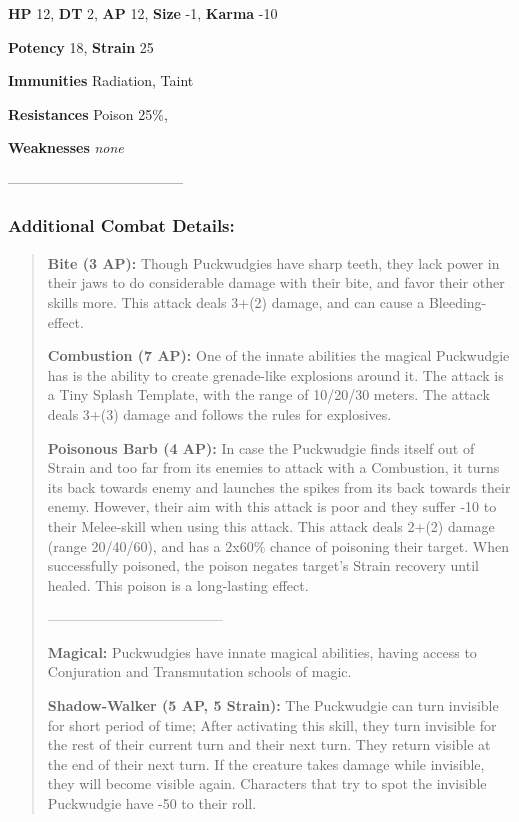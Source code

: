 \documentclass[11pt,a4paper,twocolumn]{book}
\begin{document}
	\noindent
	\textbf{HP} 12, \textbf{DT} 2, \textbf{AP} 12, \textbf{Size} -1, \textbf{Karma} -10
	
	\noindent
	\textbf{Potency} 18, \textbf{Strain} 25
	
	\noindent
	\textbf{Immunities} Radiation, Taint%
	
	\noindent
	\textbf{Resistances} Poison 25\%, %
	
	\noindent
	\textbf{Weaknesses} \emph{none}%
	
	--------------------------------------	
	
	\subsubsection*{Additional Combat Details:}
	\begin{verse}
		\textbf{Bite (3 AP):} Though Puckwudgies have sharp teeth, they lack power in their jaws to do considerable damage with their bite, and favor their other skills more. This attack deals 3+(2) damage, and can cause a Bleeding-effect.
		
		\textbf{Combustion (7 AP):} One of the innate abilities the magical Puckwudgie has is the ability to create grenade-like explosions around it. The attack is a Tiny Splash Template, with the range of 10/20/30 meters. The attack deals 3+(3) damage and follows the rules for explosives.
		
		\textbf{Poisonous Barb (4 AP):} In case the Puckwudgie finds itself out of Strain and too far from its enemies to attack with a Combustion, it turns its back towards enemy and launches the spikes from its back towards their enemy. However, their aim with this attack is poor and they suffer -10 to their Melee-skill when using this attack. This attack deals 2+(2) damage (range 20/40/60), and has a 2x60\% chance of poisoning their target. When successfully poisoned, the poison negates target's Strain recovery until healed. This poison is a long-lasting effect. 
		
		--------------------------------------		
		
		\textbf{Magical:} Puckwudgies have innate magical abilities, having access to Conjuration and Transmutation schools of magic. 
		
		\textbf{Shadow-Walker (5 AP, 5 Strain):} The Puckwudgie can turn invisible for short period of time; After activating this skill, they turn invisible for the rest of their current turn and their next turn. They return visible at the end of their next turn. If the creature takes damage while invisible, they will become visible again. Characters that try to spot the invisible Puckwudgie have -50 to their roll.
		
%		
%		
	\end{verse}
	
\end{document}
